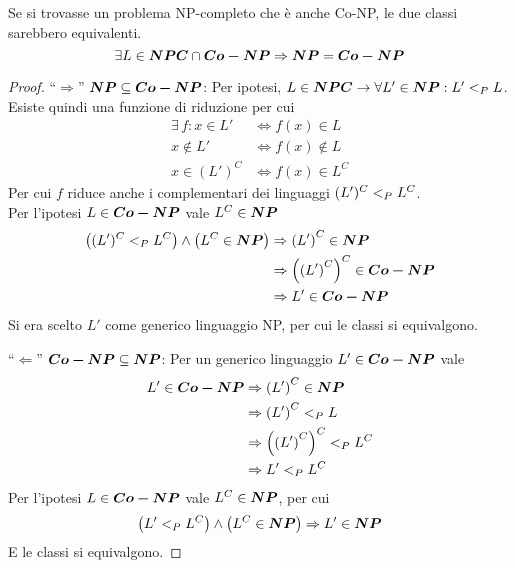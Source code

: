 \begin{theorem}
    \label{teo:npvsconp}
    Se si trovasse un problema NP-completo che è anche Co-NP, le due classi sarebbero equivalenti.
    \begin{equation*}
        \exists L \in \bm{NPC} \cap \bm{Co-NP}
        \Rightarrow
        \bm{NP} = \bm{Co-NP}
    \end{equation*}
    \begin{proof}
    ``$\Rightarrow$''
    $ \bm{NP} \subseteq \bm{Co-NP} $:
    Per ipotesi, 
    $
    L \in \bm{NPC} \to \forall L' \in \bm{NP} : L' <_P L
    $.
    Esiste quindi una funzione di riduzione per cui
    \begin{align*}
        \exists \, f :
        x \in L'
        & \Leftrightarrow
        f(x) \in L
        \\
        x \notin L'
        & \Leftrightarrow
        f(x) \notin L
        \\
        x \in \left( L' \right)^C
        & \Leftrightarrow
        f(x) \in L^C
    \end{align*}
    Per cui $f$ riduce anche i complementari dei linguaggi
    $ ( L' )^C <_P L^C $.
    \\
    Per l'ipotesi 
    $L \in \bm{Co-NP}$
    vale
    $L^C \in \bm{NP}$
    \begin{align*}
        \left( 
        ( L' )^C <_P L^C
        \right)
        \wedge
        \left( 
        L^C \in \bm{NP}
        \right)
        & \Rightarrow
        \left( L' \right)^C \in \bm{NP}
        \\
        & \Rightarrow
        \left( \left( L' \right)^C \right)^C \in \bm{Co-NP}
        \\
        & \Rightarrow
        L' \in \bm{Co-NP}
    \end{align*}
    Si era scelto $L'$ come generico linguaggio NP,
    per cui le classi si equivalgono.
    
    ``$\Leftarrow$''
    $ \bm{Co-NP} \subseteq \bm{NP} $:
    Per un generico linguaggio $ L' \in \bm{Co-NP} $ vale
    \begin{align*}
        L' \in \bm{Co-NP}
        & \Rightarrow
        \left( L' \right)^C \in \bm{NP}
        \\
        & \Rightarrow
        \left( L' \right)^C <_P L
        \\
        & \Rightarrow
        \left( \left( L' \right)^C \right)^C <_P L^C
        \\
        & \Rightarrow
        L' <_P L^C
    \end{align*}
    Per l'ipotesi 
    $L \in \bm{Co-NP}$
    vale
    $L^C \in \bm{NP}$,
    per cui
    \begin{equation*}
        \left( 
            L' <_P L^C
        \right)
        \wedge
        \left( 
            L^C \in \bm{NP}
        \right)
        \Rightarrow
        L' \in \bm{NP}
    \end{equation*}
    E le classi si equivalgono.
    \end{proof}
\end{theorem}

